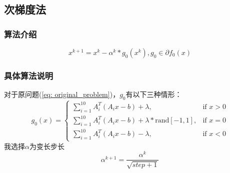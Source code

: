\documentclass{article}
\begin{document}
\newpage
\subsection{次梯度法}
\subsubsection{算法介绍}
\begin{equation}
    x^{k+1} = x^k - \alpha^k * g_0(x^k), g_0 \in \partial f_0(x)
\end{equation}

\subsubsection{具体算法说明}
对于原问题(\ref{eq: original_problem})，$g_0$有以下三种情形：
\begin{equation}
    g_0(x) =
    \begin{cases}
        \sum_{i=1}^{10}A_i^T(A_i x-b) + \lambda,                                & \text{if } x>0 \\
        \sum_{i=1}^{10}A_i^T(A_i x-b) + \lambda * \text{rand}\left[-1,1\right], & \text{if } x=0 \\
        \sum_{i=1}^{10}A_i^T(A_i x-b) - \lambda,                                & \text{if } x<0
    \end{cases}
    \label{eq: eq3.1}
\end{equation}
我选择$\alpha$为变长步长
\begin{equation}
    \alpha^{k+1} = \frac{\alpha^k}{\sqrt{step+1}}
    \label{eq: eq3.2}
\end{equation}
\end{document}
